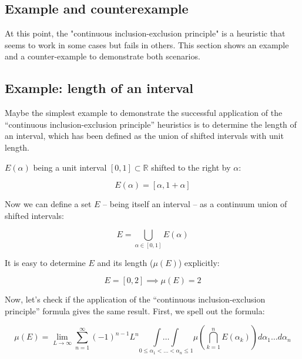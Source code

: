 \documentclass{article}
\theoremstyle{definition}
\begin{document}
\begin{appendices}

\section{Example and counterexample}

At this point, the "continuous inclusion-exclusion principle" is a heuristic that seems to work in some cases but fails in others.
This section shows an example and a counter-example to demonstrate both scenarios.

\subsection{Example: length of an interval}

Maybe the simplest example to demonstrate the successful application of the ``continuous inclusion-exclusion principle'' heuristics is to determine the length of an interval, which has been defined as the union of shifted intervals with unit length.

$E(\alpha)$ being a unit interval $[0,1] \subset \mathbb{R}$ shifted to the right by $\alpha$: 

\begin{equation}
    E(\alpha) = [\alpha, 1 + \alpha]
\end{equation}

Now we can define a set $E$ -- being itself an interval -- as a continuum union of shifted intervals:

\begin{equation}
    E = \bigcup_{\alpha \in [0,1]} E(\alpha)
\end{equation}

It is easy to determine $E$ and its length ($\mu(E)$) explicitly:

\begin{equation}
    E = [0,2] \implies \boxed{\mu(E) = 2}
\end{equation}

Now, let's check if the application of the ``continuous inclusion-exclusion principle'' formula gives the same result.
First, we spell out the formula:

\begin{equation}
    \mu(E) = \lim_{L \to \infty} \sum_{n=1}^\infty (-1)^{n-1} L^n
    \underset{0 \le \alpha_1 < \dots < \alpha_n \le 1}{\int\dots\int}
    \mu \left ( 
    \bigcap_{k=1}^n E(\alpha_k)
    \right ) 
    d\alpha_1\dots d\alpha_n
\end{equation}


\end{appendices}
\end{document}
